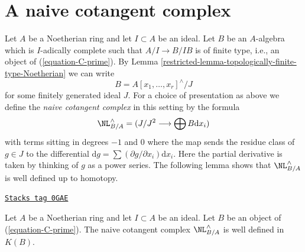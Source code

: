 \section{A naive cotangent complex}
\label{restricted-section-naive-cotangent-complex}
Let $A$ be a Noetherian ring and let $I \subset A$ be an ideal.
Let $B$ be an $A$-algebra which is $I$-adically complete such
that $A/I \to B/IB$ is of finite type, i.e., an object of
(\ref{equation-C-prime}).
By Lemma \ref{restricted-lemma-topologically-finite-type-Noetherian} we can write
$$
B = A[x_1, \ldots, x_r]^\wedge / J
$$
for some finitely generated ideal $J$. For a choice of presentation as
above we define the {\it naive cotangent complex}
in this setting by the formula
\begin{equation}
\label{equation-NL}
\NL_{B/A}^\wedge = (J/J^2 \longrightarrow \bigoplus B\text{d}x_i)
\end{equation}
with terms sitting in degrees $-1$ and $0$
where the map sends the residue class of $g \in J$ to the differential
$\text{d}g = \sum (\partial g/\partial x_i) \text{d}x_i$. Here
the partial derivative is taken by thinking of $g$ as a power series.
The following lemma shows that $\NL_{B/A}^\wedge$ is well defined
up to homotopy.

\begin{lemma}[NL up to homotopy]
\label{restricted-lemma-NL-up-to-homotopy}
\href{https://stacks.math.columbia.edu/tag/0GAE}{\texttt{Stacks tag 0GAE}}

Let $A$ be a Noetherian ring and let $I \subset A$ be an ideal.
Let $B$ be an object of (\ref{equation-C-prime}). The naive
cotangent complex $\NL_{B/A}^\wedge$ is well defined in $K(B)$.
\end{lemma}

